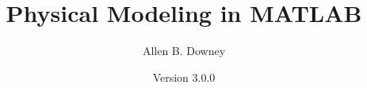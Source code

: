 




\usepackage{xcolor}

\usepackage{listings}
\iffalse
\lstset{
    language=matlab,
    basicstyle=\ttfamily,
    backgroundcolor=\color{bgcolor},
    commentstyle=\color{comment},
    keywordstyle=\color{keyword},
    stringstyle=\color{strings},
    columns=fullflexible,
    emph={label},  %
    keepspaces=true,
    showstringspaces=false,
    upquote=true,
    xleftmargin=0pt,  %
    framexleftmargin=3pt,
    aboveskip=\parskip,
    belowskip=\parskip
}
\fi
{}

\newcommand{\mcode}[1]{\lstinline{#1}}%

\usepackage{siunitx}

\usepackage{nshyper}
\renewcommand{\seename}{See}
\renewcommand{\alsoname}{See also}

\makeindex
\makeatletter
\def\idxdelim{\@ifnextchar{\hyperindexformat}{. }{, }}
\makeatother


\sloppy
\def\UrlFont{\em}

\frontmatter


\newcommand{\thetitle}{Physical Modeling in MATLAB}
\newcommand{\theversion}{3.0.0}

\title {\thetitle}
\author {Allen B. Downey}
\date {Version \theversion}


\maketitle

